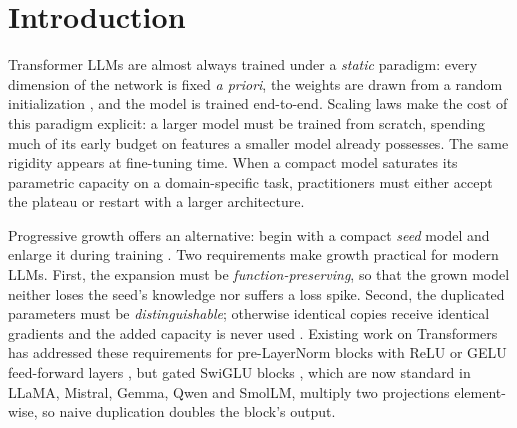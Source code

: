 \section{Introduction}
Transformer LLMs \citep{vaswani2017attention,touvron2023llama,qwen2024technical} are almost always trained under a \emph{static} paradigm: every dimension of the network is fixed \textit{a priori}, the weights are drawn from a random initialization \citep{glorot2010understanding,he2015delving}, and the model is trained end-to-end.
Scaling laws \citep{kaplan2020scaling,hoffmann2022chinchilla} make the cost of this paradigm explicit: a larger model must be trained from scratch, spending much of its early budget on features a smaller model already possesses.
The same rigidity appears at fine-tuning time. When a compact model saturates its parametric capacity on a domain-specific task, practitioners must either accept the plateau or restart with a larger architecture.

Progressive growth offers an alternative: begin with a compact \emph{seed} model and enlarge it during training \citep{chen2015net2net,gong2019stacking,chen2022bert2bert,wang2023ligo}.
Two requirements make growth practical for modern LLMs.
First, the expansion must be \emph{function-preserving}, so that the grown model neither loses the seed's knowledge nor suffers a loss spike.
Second, the duplicated parameters must be \emph{distinguishable}; otherwise identical copies receive identical gradients and the added capacity is never used \citep{chen2015net2net}.
Existing work on Transformers has addressed these requirements for pre-LayerNorm blocks with ReLU or GELU feed-forward layers \citep{chen2022bert2bert,wang2024lemon}, but gated SwiGLU blocks \citep{shazeer2020glu}, which are now standard in LLaMA, Mistral, Gemma, Qwen and SmolLM, multiply two projections element-wise, so naive duplication doubles the block's output.

